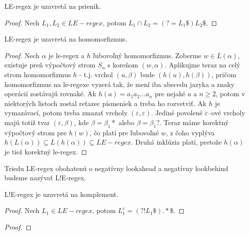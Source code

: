 \begin{veta}
LE-regex je uzavretá na prienik.
\end{veta}
\begin{proof}
Nech $L_1,L_2 \in LE-regex$, potom $L_1 \cap L_2 = \left( ?= L_1 \mathdollar \right) L_2 \mathdollar $.
\end{proof}

\begin{veta}
LE-regex je uzavretá na homomorfizmus.
\end{veta}
\begin{proof}
Nech $\alpha$ je le-regex a $h$ ľubovoľný homomorfizmus. Zoberme $w \in L(\alpha)$, existuje preň výpočtový strom $S_\alpha$ s koreňom $(w,\alpha)$. Aplikujme teraz na celý strom homomorfizmus $h$ - t.j. vrchol $(u,\beta)$ bude $(h(u),h(\beta))$, pričom homomorfizmus na le-regexe vyzerá tak, že mení iba abecedu jazyka a znaky operácií zostávajú rovnaké. Ak $h(a) = a_1a_2\dots a_n$ pre nejaké $a$ a $n \geq 2$, potom v niektorých listoch zostal reťazec písmeniek a treba ho rozvetviť. Ak $h$ je vymazávací, potom treba zmazať vrcholy $(\varepsilon,\varepsilon)$. Jediné povolené $\varepsilon$--ové vrcholy majú totiž tvar $(\varepsilon,\beta)$, kde $\beta = \beta_1 *$ alebo $\beta = \beta_1 ?$. Teraz máme korektný výpočtový strom pre $h(w)$, čo platí pre ľubovoľné $w$, z čoho vyplýva $h(L(\alpha)) \subseteq L(h(\alpha)) \subseteq LE-regex$. Druhá inklúzia platí, pretože $h(\alpha)$ je tiež korektný le-regex.
\end{proof}


Triedu LE-regex obohatenú o negatívny lookahead a negatívny lookbehind budeme nazývať L!E-regex.

\begin{veta}
L!E-regex je uzavretá na komplement.
\end{veta}
\begin{proof}
Nech $L_1 \in LE-regex$, potom $L_1^c  = \left( ?! L_1 \mathdollar \right) .* \mathdollar $.
\end{proof}

\begin{veta}
\end{veta}
\begin{proof}
\end{proof}


